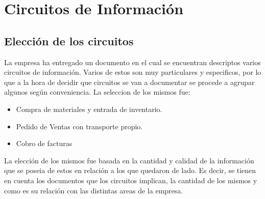 \section{ Circuitos de Informaci\'on}

\subsection{ Elecci\'on de los circuitos}

La empresa ha entregado un documento en el cual se encuentran descriptos varios circuitos de informaci\'on. Varios de estos son muy particulares y especificos, por lo que a la hora de decidir que circuitos se van a documentar se procede a agrupar algunos seg\'un conveniencia.
La seleccion de los mismos fue:
\begin{itemize}
\item Compra de materiales y entrada de inventario.
\item Pedido de Ventas con transporte propio.
\item Cobro de facturas
\end{itemize}

La elecci\'on de los mismos fue basada en la cantidad y calidad de la informaci\'on que se poseia de estos en relaci\'on a los que quedaron de lado. Es decir, se tienen en cuenta los documentos que los circuitos implican, la cantidad de los mismos y como es su relaci\'on con las distintas areas de la empresa.